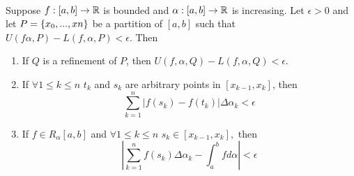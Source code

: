 \begin{theorem}  \leavevmode \\
    \label{thm6.7}
    Suppose $f:[a,b]\to \mathbb{R}$ is bounded and $\alpha: [a,b] \to \mathbb{R}$ is increasing. Let $\epsilon > 0$ and let $P = \left\{x_0, ..., xn\right\}$ be a partition of $[a,b]$ such that $U(f \alpha, P) - L(f, \alpha, P) < \epsilon.$ Then 
    \begin{enumerate}[($i$)]
        \item If $Q$ is a refinement of $P$, then $U(f, \alpha, Q) - L(f, \alpha, Q) < \epsilon.$
        \item If $\forall 1 \leq k \leq n$ $t_k$ and $s_k$ are arbitrary points in $[x_{k-1}, x_k]$, then 
        $$\sum_{k=1}^{n}\left|f(s_k)-f(t_k)\right|\Delta\alpha_k < \epsilon$$
        \item If $f \in R_\alpha[a,b]$ and $\forall 1 \leq k \leq n$ $s_k \in [x_{k-1}, x_k],$ then 
        $$\left|\sum_{k=1}^{n}f(s_k)\Delta \alpha_k - \int_{a}^{b}f d\alpha\right| < \epsilon$$
    \end{enumerate}
\end{theorem}

